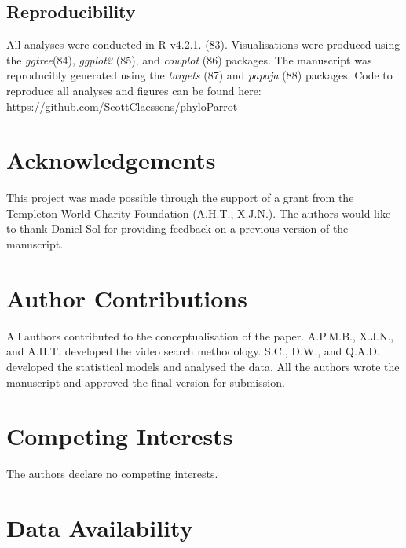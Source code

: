 \documentclass[
  man,floatsintext]{apa6}
\begin{document}
\hypertarget{reproducibility}{%
\subsection{Reproducibility}\label{reproducibility}}

All analyses were conducted in R v4.2.1. (83). Visualisations were
produced using the \emph{ggtree}(84), \emph{ggplot2} (85), and \emph{cowplot}
(86) packages. The manuscript was reproducibly generated using the
\emph{targets} (87) and \emph{papaja} (88) packages. Code to reproduce all
analyses and figures can be found here:
\url{https://github.com/ScottClaessens/phyloParrot}

\newpage
\nolinenumbers

\hypertarget{acknowledgements}{%
\section{Acknowledgements}\label{acknowledgements}}

This project was made possible through the support of a grant from the Templeton
World Charity Foundation (A.H.T., X.J.N.). The authors would like to thank
Daniel Sol for providing feedback on a previous version of the manuscript.

\hypertarget{author-contributions}{%
\section{Author Contributions}\label{author-contributions}}

All authors contributed to the conceptualisation of the paper. A.P.M.B., X.J.N.,
and A.H.T. developed the video search methodology. S.C., D.W., and Q.A.D.
developed the statistical models and analysed the data. All the authors wrote
the manuscript and approved the final version for submission.

\hypertarget{competing-interests}{%
\section{Competing Interests}\label{competing-interests}}

The authors declare no competing interests.

\hypertarget{data-availability}{%
\section{Data Availability}\label{data-availability}}
\end{document}
